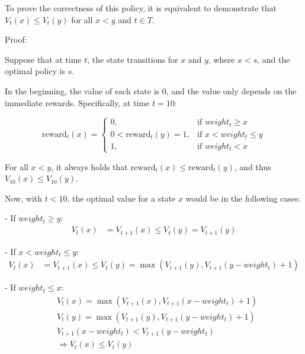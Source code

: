To prove the correctness of this policy, it is equivalent to demonstrate that $V_t(x) \leq V_t(y)$ for all $x < y$ and $t \in T$.

Proof:

Suppose that at time $t$, the state transitions for $x$ and $y$, where $x < s$, and the optimal policy is $s$. %


In the beginning, the value of each state is 0, and the value only depends on the immediate rewards. Specifically, at time $t=10$:

\begin{equation}
\text{reward}_{t}(x) = 
\begin{cases}
0, & \text{if } weight_t \ge x \\
0 < \text{reward}_{t}(y) = 1, & \text{if } x < weight_t \leq y \\
1, & \text{if } weight_t < x
\end{cases}
\end{equation}

For all $x < y$, it always holds that $\text{reward}_{t}(x) \leq \text{reward}_{t}(y)$, and thus $V_{10}(x) \leq V_{10}(y)$.

Now, with $t < 10$, the optimal value for a state $x$ would be in the following cases:

- If $weight_t \ge y$:
  \begin{align*}
  V_t(x) &= V_{t+1}(x) \leq V_{t}(y) = V_{t+1}(y)
  \end{align*}

- If $x < weight_t \leq y$:
  \begin{align*}
  V_t(x) &= V_{t+1}(x) \leq V_{t}(y) = \max(V_{t+1}(y), V_{t+1}(y - weight_t) + 1)
  \end{align*}

- If $weight_t \leq x$:
  \begin{align*}
  & V_t(x) = \max(V_{t+1}(x), V_{t+1}(x - weight_t) + 1) \\
  & V_{t}(y) = \max(V_{t+1}(y), V_{t+1}(y - weight_t) + 1) \\
  & V_{t+1}(x - weight_t) < V_{t+1}(y - weight_t) \\
  & \Rightarrow V_t(x) \leq V_t(y)
  \end{align*}

